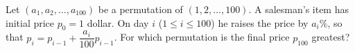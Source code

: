 Let $(a_1,a_2,\dots,a_{100})$ be a permutation of $(1,2,\dots,100)$. A salesman's item has initial price $p_0=1$ dollar. On day $i$ ($1\le i\le100$) he raises the price by $a_i\%$, so that $p_i=p_{i-1}+\dfrac{a_i}{100}p_{i-1}$. For which permutation is the final price $p_{100}$ greatest?

